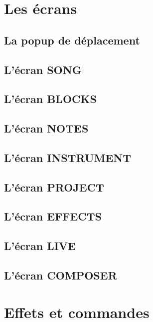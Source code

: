 \documentclass[12pt,a4paper]{article}
\begin{document}
  \section{Les écrans}
  
    
  
    \subsection{La popup de déplacement}
  
    \subsection{L'écran SONG}
    
    \subsection{L'écran BLOCKS}
    
    \subsection{L'écran NOTES}
    
    \subsection{L'écran INSTRUMENT}
    
    \subsection{L'écran PROJECT}
    
    \subsection{L'écran EFFECTS}
    
    \subsection{L'écran LIVE}
    
    \subsection{L'écran COMPOSER}  
    
  \section{Effets et commandes}
	
\end{document}
